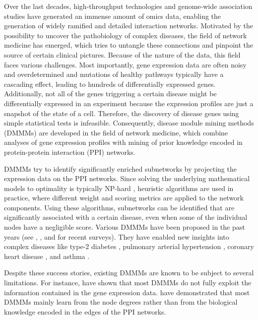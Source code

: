 \documentclass{bioinfo}
\begin{document}
Over the last decades, high-throughput technologies and genome-wide association studies have generated an immense amount of omics data, enabling the generation of widely ramified and detailed interaction networks. Motivated by the possibility to uncover the pathobiology of complex diseases, the field of network medicine has emerged, which tries to untangle these connections and pinpoint the source of certain clinical pictures. Because of the nature of the data, this field faces various challenges. Most importantly, gene expression data are often noisy and overdetermined and mutations of healthy pathways typically have a cascading effect, leading to hundreds of differentially expressed genes. Additionally, not all of the genes triggering a certain disease might be differentially expressed in an experiment because the expression profiles are just a snapshot of the state of a cell. Therefore, the discovery of disease genes using simple statistical tests is infeasible. Consequently, disease module mining methods (DMMMs) are developed in the field of network medicine, which combine analyses of gene expression profiles with mining of prior knowledge encoded in protein-protein interaction (PPI) networks. 

DMMMs try to identify significantly enriched subnetworks by projecting the expression data on the PPI networks. Since solving the underlying mathematical models to optimality is typically NP-hard \citep{np_ideker2002}, heuristic algorithms are used in practice, where different weight and scoring metrics are applied to the network components. Using these algorithms, subnetworks can be identified that are significantly associated with a certain disease, even when some of the individual nodes have a negligible score. Various DMMMs have been proposed in the past years (see \cite{Batra2017-po}, \cite{Lazareva2021-jb}, and \cite{amim_lazareva2021} for recent surveys). They have enabled new insights into complex diseases like type-2 diabetes \citep{diabetes_sharma2018,diabetes_fernandez2019}, pulmonary arterial hypertension \citep{pulmonary_samokhin2018}, coronary heart disease \citep{coronary_wang2018}, and asthma \citep{asthma_sharma2015}.

Despite these success stories, existing DMMMs are known to be subject to several limitations. For instance, \cite{domino_levi2021} have shown that most DMMMs do not fully exploit the information contained in the gene expression data. \cite{amim_lazareva2021} have demonstrated that most DMMMs mainly learn from the node degrees rather than from the biological knowledge encoded in the edges of the PPI networks. 
\end{document}
